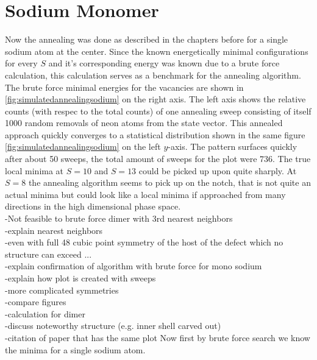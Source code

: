 \section{Sodium Monomer}
Now the annealing was done as described in the chapters before for a single sodium atom at the center. Since the known energetically minimal configurations for every $S$ and it's corresponding energy was known due to a brute force calculation, this calculation serves as a benchmark for the annealing algorithm. The brute force minimal energies for the vacancies are shown in \ref{fig:simulatedannealingsodium} on the right axis. The left axis shows the relative counts (with respec to the total counts) of one annealing sweep consisting of itself 1000 random removals of neon atoms from the state vector. This annealed approach quickly converges to a statistical distribution shown in the same figure \ref{fig:simulatedannealingsodium} on the left $y$-axis. The pattern surfaces quickly after about 50 sweeps, the total amount of sweeps for the plot were 736. The true local minima at $S=10$ and $S=13$ could be picked up upon quite sharply. At $S=8$ the annealing algorithm seems to pick up on the notch, that is not quite an actual minima but could look like a local minima if approached from many directions in the high dimensional phase space.\\  
-Not feasible to brute force dimer with 3rd nearest neighbors\\
-explain nearest neighbors\\
-even with full 48 cubic point symmetry of the host of the defect which no structure can exceed ...\\ 
-explain confirmation of algorithm with brute force for mono sodium\\
-explain how plot is created with sweeps\\
-more complicated symmetries\\
-compare figures\\
-calculation for dimer\\
-discuss noteworthy structure (e.g. inner shell carved out)\\
-citation of paper that has the same plot
Now first by brute force search we know the minima for a single sodium atom.


